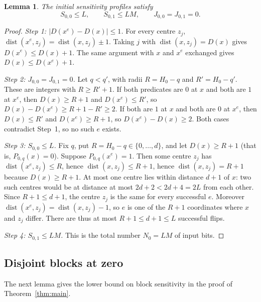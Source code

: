 \documentclass[11pt]{article}
\newtheorem{lemma}[theorem]{Lemma}
\theoremstyle{definition}
\theoremstyle{remark}
\begin{document}
\begin{lemma}\label{lem:base}
The initial sensitivity profiles satisfy
\begin{equation}\label{eq:base-profile}
 S_{0,0}\le L,\qquad S_{0,1}\le LM,\qquad
 J_{0,0}=J_{0,1}=0.
\end{equation}
\end{lemma}
\begin{proof}
\emph{Step 1: \(|D(x^e)-D(x)|\le1\).}
For every centre \(z_j\), \(\operatorname{dist}(x^e,z_j)=\operatorname{dist}(x,z_j)\pm1\).
Taking \(j\) with \(\operatorname{dist}(x,z_j)=D(x)\) gives \(D(x^e)\le D(x)+1\). The same argument with \(x\) and \(x^e\) exchanged gives \(D(x)\le D(x^e)+1\).

\emph{Step 2: \(J_{0,0}=J_{0,1}=0\).}
Let \(q<q'\), with radii \(R=H_0-q\) and \(R'=H_0-q'\). These are integers with \(R\ge R'+1\).
If both predicates are \(0\) at \(x\) and both are \(1\) at \(x^e\), then \(D(x)\ge R+1\) and \(D(x^e)\le R'\), so \(D(x)-D(x^e)\ge R+1-R'\ge2\).
If both are \(1\) at \(x\) and both are \(0\) at \(x^e\), then \(D(x)\le R'\) and \(D(x^e)\ge R+1\), so \(D(x^e)-D(x)\ge2\).
Both cases contradict Step~1, so no such \(e\) exists.

\emph{Step 3: \(S_{0,0}\le L\).}
Fix \(q\), put \(R=H_0-q\in\{0,\ldots,d\}\), and let \(D(x)\ge R+1\) (that is, \(P_{0,q}(x)=0\)).
Suppose \(P_{0,q}(x^e)=1\). Then some centre \(z_j\) has \(\operatorname{dist}(x^e,z_j)\le R\), hence \(\operatorname{dist}(x,z_j)\le R+1\), hence \(\operatorname{dist}(x,z_j)=R+1\) because \(D(x)\ge R+1\).
At most one centre lies within distance \(d+1\) of \(x\): two such centres would be at distance at most \(2d+2<2d+4=2L\) from each other.
Since \(R+1\le d+1\), the centre \(z_j\) is the same for every successful \(e\).
Moreover \(\operatorname{dist}(x^e,z_j)=\operatorname{dist}(x,z_j)-1\), so \(e\) is one of the \(R+1\) coordinates where \(x\) and \(z_j\) differ.
There are thus at most \(R+1\le d+1\le L\) successful flips.

\emph{Step 4: \(S_{0,1}\le LM\).} This is the total number \(N_0=LM\) of input bits.
\end{proof}

\subsection{Disjoint blocks at zero}

The next lemma gives the lower bound on block sensitivity in the proof of Theorem~\ref{thm:main}.
\end{document}
